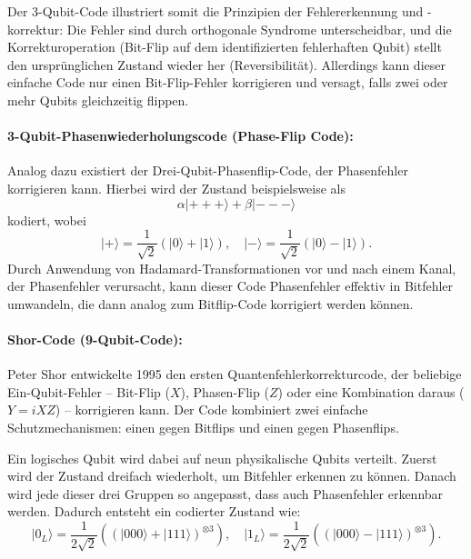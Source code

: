 Der 3-Qubit-Code illustriert somit die Prinzipien der Fehlererkennung und -korrektur: Die Fehler sind durch orthogonale Syndrome unterscheidbar, und die Korrekturoperation (Bit-Flip auf dem identifizierten fehlerhaften Qubit) stellt den ursprünglichen Zustand wieder her (Reversibilität). Allerdings kann dieser einfache Code nur einen Bit-Flip-Fehler korrigieren und versagt, falls zwei oder mehr Qubits gleichzeitig flippen.
\cite[Seite 430-431]{nielsen_quantum_2010}\\

\paragraph{3-Qubit-Phasenwiederholungscode (Phase-Flip Code):}
Analog dazu existiert der Drei-Qubit-Phasenflip-Code, der Phasenfehler korrigieren kann. Hierbei wird der Zustand beispielsweise als
\[
\alpha \lvert{+++}\rangle + \beta \lvert{---}\rangle
\]
kodiert, wobei
\[
\lvert + \rangle = \frac{1}{\sqrt{2}}(\lvert 0 \rangle + \lvert 1 \rangle), \quad
\lvert - \rangle = \frac{1}{\sqrt{2}}(\lvert 0 \rangle - \lvert 1 \rangle).
\]
Durch Anwendung von Hadamard-Transformationen vor und nach einem Kanal, der Phasenfehler verursacht, kann dieser Code Phasenfehler effektiv in Bitfehler umwandeln, die dann analog zum Bitflip-Code korrigiert werden können.
\cite[Seite 430-431]{nielsen_quantum_2010}\\

\paragraph{Shor-Code (9-Qubit-Code):}

Peter Shor entwickelte 1995 den ersten Quantenfehlerkorrekturcode, der beliebige Ein-Qubit-Fehler – Bit-Flip (\(X\)), Phasen-Flip (\(Z\)) oder eine Kombination daraus (\(Y = iXZ\)) – korrigieren kann. Der Code kombiniert zwei einfache Schutzmechanismen: einen gegen Bitflips und einen gegen Phasenflips.

Ein logisches Qubit wird dabei auf neun physikalische Qubits verteilt. Zuerst wird der Zustand dreifach wiederholt, um Bitfehler erkennen zu können. Danach wird jede dieser drei Gruppen so angepasst, dass auch Phasenfehler erkennbar werden. Dadurch entsteht ein codierter Zustand wie:
\[
\lvert 0_L \rangle = \frac{1}{2\sqrt{2}} \left( ( \lvert 000 \rangle + \lvert 111 \rangle )^{\otimes 3} \right),
\quad
\lvert 1_L \rangle = \frac{1}{2\sqrt{2}} \left( ( \lvert 000 \rangle - \lvert 111 \rangle )^{\otimes 3} \right).
\]

